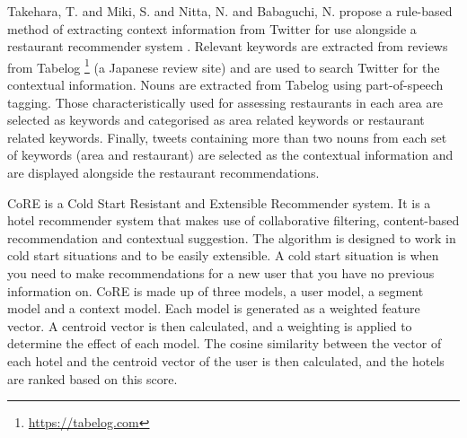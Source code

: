 Takehara, T. and Miki, S. and Nitta, N. and Babaguchi, N. propose a rule-based method of extracting context information from Twitter for use alongside a restaurant recommender system \cite{takeharaContext2012}. Relevant keywords are extracted from reviews from Tabelog \footnote{\url{https://tabelog.com}} (a Japanese review site) and are used to search Twitter for the contextual information. Nouns are extracted from Tabelog using part-of-speech tagging. Those characteristically used for assessing restaurants in each area are selected as keywords and categorised as area related keywords or restaurant related keywords. Finally, tweets containing more than two nouns from each set of keywords (area and restaurant) are selected as the contextual information and are displayed alongside the restaurant recommendations.

CoRE \cite{core2019} is a Cold Start Resistant and Extensible Recommender system. It is a hotel recommender system that makes use of collaborative filtering, content-based recommendation and contextual suggestion. The algorithm is designed to work in cold start situations and to be easily extensible. A cold start situation is when you need to make recommendations for a new user that you have no previous information on. CoRE is made up of three models, a user model, a segment model and a context model. Each model is generated as a weighted feature vector. A centroid vector is then calculated, and a weighting is applied to determine the effect of each model. The cosine similarity between the vector of each hotel and the centroid vector of the user is then calculated, and the hotels are ranked based on this score.


